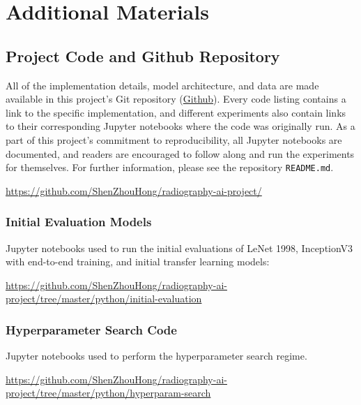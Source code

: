 \setlength{\headwidth}{\textwidth}

\chapter{Additional Materials}

\section{Project Code and Github Repository}\label{sec:appendix-repo}

All of the implementation details, model architecture, and data are made available in this project's Git repository (\href{https://github.com/ShenZhouHong/radiography-ai-project/}{Github}). Every code listing contains a link to the specific implementation, and different experiments also contain links to their corresponding Jupyter notebooks where the code was originally run. As a part of this project's commitment to reproducibility, all Jupyter notebooks are documented, and readers are encouraged to follow along and run the experiments for themselves. For further information, please see the repository \texttt{README.md}.

\url{https://github.com/ShenZhouHong/radiography-ai-project/}

\subsection{Initial Evaluation Models}

Jupyter notebooks used to run the initial evaluations of LeNet 1998, InceptionV3 with end-to-end training, and initial transfer learning models:

\url{https://github.com/ShenZhouHong/radiography-ai-project/tree/master/python/initial-evaluation}

\subsection{Hyperparameter Search Code}

Jupyter notebooks used to perform the hyperparameter search regime.

\url{https://github.com/ShenZhouHong/radiography-ai-project/tree/master/python/hyperparam-search}


